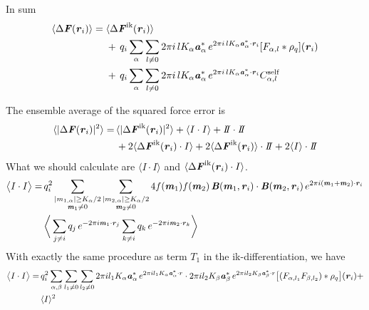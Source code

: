 \documentclass[aps,pre,preprint]{revtex4}
\renewcommand{\v}[1]{\textbf{\textit{#1}}}
\begin{document}
In sum
\begin{align} \nonumber
  \langle \Delta\v F(\v r_i)\rangle
  =\;&
  \langle \Delta\v F^{\textrm{ik}}(\v r_i)\rangle\\\nonumber
  &+\,
  q_i\sum_{\alpha}\sum_{l\neq 0}
  2\pi i\,l K_\alpha\v a_\alpha^\ast\,e^{2\pi i\,l K_\alpha\v a^\ast_\alpha\cdot \v r_i}
  [F_{\alpha,l}\ast\rho_q](\v r_i) \\
  &+\,
  q_i\sum_{\alpha}\sum_{l\neq 0}
  2\pi i\,l K_\alpha\v a_\alpha^\ast\,e^{2\pi i\,l K_\alpha\v a^\ast_\alpha\cdot \v r_i}
  C_{\alpha,l}^{\textrm{self}}
\end{align}

The ensemble average of the squared force error is
\begin{align}\nonumber
  \langle\vert \Delta\v F(\v r_i) \vert^2\rangle
  = &\,
  \langle\vert \Delta\v F^{\textrm{ik}}(\v r_i) \vert^2\rangle
  + \langle I\cdot I\rangle
  + I\negthickspace I\cdot I\negthickspace I\\
  &\,
  + 2\langle\Delta\v F^{\textrm{ik}}(\v r_i)\cdot I\rangle
  + 2\langle\Delta\v F^{\textrm{ik}}(\v r_i)\rangle\cdot I\negthickspace I
  + 2\langle I\rangle\cdot I\negthickspace I
\end{align}
What we should calculate are $\langle I\cdot I\rangle$ and
$\langle\Delta\v F^{\textrm{ik}}(\v r_i)\cdot I\rangle$.
\begin{align}\nonumber
  \big\langle
  I\cdot I
  \big\rangle
  = \,&
  q^2_i
  \sum_{
    \begin{subarray}{c}
      \vert m_{1,\alpha}\vert \geq K_\alpha/2\\
      \v m_1\neq 0
    \end{subarray}}
  \sum_{
    \begin{subarray}{c}
      \vert m_{2,\alpha}\vert \geq K_\alpha/2\\
      \v m_2\neq 0
    \end{subarray}}
  4 f(\v m_1)f(\v m_2) \,
  \v B(\v m_1, \v r_i)\cdot\v B(\v m_2, \v r_i)
  \,e^{2\pi i(\v m_1 + \v m_2)\cdot\v r_i} \\ 
  &
  \bigg\langle
  \sum_{j\neq i}q_j\,e^{-2\pi i\v m_1\cdot\v r_j}  
  \sum_{k\neq i}q_k\,e^{-2\pi i\v m_2\cdot\v r_k}
  \bigg\rangle
\end{align}
With exactly the same procedure as term $T_1$ in the
ik-differentiation, we have
\begin{align}\nonumber
  \big\langle
  I\cdot I
  \big\rangle
  = &\, 
  q_i^2
  \sum_{\alpha, \beta}\sum_{l_1\neq 0}\sum_{l_2\neq 0}
  2\pi i l_1K_\alpha\v a_\alpha^\ast\,e^{2\pi i l_1 K_\alpha\v a_\alpha^\ast\cdot r}
  \cdot
  2\pi i l_2K_\beta \v a_\beta ^\ast\,e^{2\pi i l_2 K_\beta \v a_\beta^\ast\cdot r}
  \big[
  (F_{\alpha,l_1} F_{\beta,l_2})
  \ast \rho_q
  \big]
  (\v r_i) + \\
  &\,
  \langle I\rangle^2
\end{align}
\end{document}
